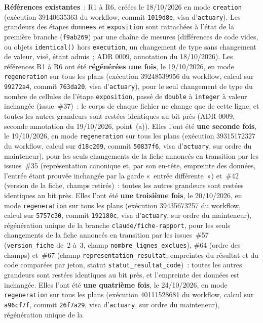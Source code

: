 \documentclass[a4paper,11pt]{article}
\newcommand{\code}[1]{\texttt{\small #1}}
\begin{document}
\medskip
\textbf{Références existantes}~: R1 à R6, créées le 18/10/2026 en mode
\code{creation} (exécution 39140635363 du workflow, commit \code{1019d8e},
visa d'\code{actuary}). Les grandeurs des étapes \code{donnees} et
\code{exposition} sont rattachées à l'état de la première branche
(\code{f9ab269}) par une chaîne de mesures (différences de code vides, ou
objets \code{identical()} hors \code{execution}, un changement de type sans
changement de valeur, visé, étant admis~; ADR 0009, annotation du
18/10/2026). Les références R1 à R6 ont été \textbf{régénérées une fois}, le 19/10/2026, en
mode \code{regeneration} sur tous les plans (exécution 39248539956 du
workflow, calcul sur \code{99272a4}, commit \code{763da20}, visa
d'\code{actuary}), pour le seul changement de type du nombre de cellules de
l'étape \code{exposition}, passé de \code{double} à \code{integer} à valeur
inchangée (issue~\#37)~: le corps de chaque fichier ne change que de cette
ligne, et toutes les autres grandeurs sont restées identiques au bit près
(ADR 0009, seconde annotation du 19/10/2026, point~(a)). Elles l'ont été
\textbf{une seconde fois}, le 19/10/2026, en mode \code{regeneration} sur
tous les plans (exécution 39315172327 du workflow, calcul sur
\code{d18c269}, commit \code{50837f6}, visa d'\code{actuary}, sur ordre du
mainteneur), pour les seuls changements de la fiche annoncés en transition
par les issues~\#35 (représentation canonique et, par son en-tête,
empreinte des données, l'entrée étant prouvée inchangée par la garde
«~entrée différente~») et~\#42 (version de la fiche, champs retirés)~:
toutes les autres grandeurs sont restées identiques au bit près. Elles l'ont
été \textbf{une troisième fois}, le 20/10/2026, en mode \code{regeneration}
sur tous les plans (exécution 39435673257 du workflow, calcul sur
\code{5757c30}, commit \code{192180c}, visa d'\code{actuary}, sur ordre du
mainteneur), régénération unique de la branche \code{claude/fiche-rapport},
pour les seuls changements de la fiche annoncés en transition par les
issues~\#57 (\code{version\_fiche} de~2 à~3, champ
\code{nombre\_lignes\_exclues}), \#64 (ordre des champs) et~\#67 (champ
\code{representation\_resultat}, empreintes du résultat et du code
comparées par jeton, statut \code{statut\_resultat\_code})~: toutes les
autres grandeurs sont restées identiques au bit près, et l'empreinte des
données est inchangée. Elles l'ont été \textbf{une quatrième fois}, le
24/10/2026, en mode \code{regeneration} sur tous les plans (exécution
40111528681 du workflow, calcul sur \code{a96cf7f}, commit \code{26f7a29},
visa d'\code{actuary}, sur ordre du mainteneur), régénération unique de la
\end{document}
